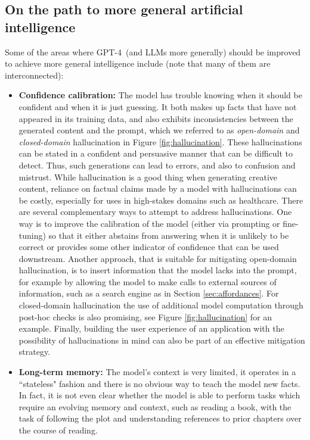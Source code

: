 \subsection{On the path to more general artificial intelligence}

Some of the areas where GPT-4\ (and LLMs more generally) should be improved to achieve more general intelligence include (note that many of them are interconnected):

\begin{itemize}
    \item \textbf{Confidence calibration:} The model has trouble knowing when it should be confident and when it is just guessing. It both makes up facts that have not appeared in its training data, and also exhibits inconsistencies between the generated content and the prompt, which we referred to as {\em open-domain} and {\em closed-domain} hallucination in Figure \ref{fig:hallucination}. These hallucinations can be stated in a confident and persuasive manner that can be difficult to detect. Thus, such generations can lead to errors, and also to confusion and mistrust. While hallucination is a good thing when generating creative content, reliance on factual claims made by a model with hallucinations can be costly, especially for uses in high-stakes domains such as healthcare. There are several complementary ways to attempt to address hallucinations. One way is to improve the calibration of the model (either via prompting or fine-tuning) so that it either abstains from answering when it is unlikely to be correct or provides some other indicator of confidence that can be used downstream. Another approach, that is suitable for mitigating open-domain hallucination, is to insert information that the model lacks into the prompt, for example by allowing the model to make calls to external sources of information, such as a search engine as in Section \ref{sec:affordances}. For closed-domain hallucination the use of additional model computation through post-hoc checks is also promising, see Figure \ref{fig:hallucination} for an example. Finally, building the user experience of an application with the possibility of hallucinations in mind can also be part of an effective mitigation strategy. 
    \item \textbf{Long-term memory:} The model's context is very limited, it operates in a ``stateless" fashion and there is no obvious way to teach the model new facts. In fact, it is not even clear whether the model is able to perform tasks which require an evolving memory and context, such as reading a book, with the task of following the plot and understanding references to prior chapters over the course of reading.

\end{itemize}
